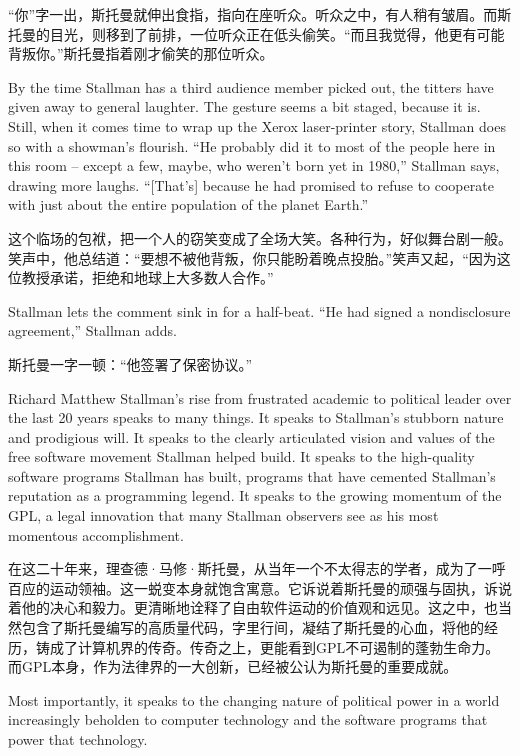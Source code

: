 \ifdefined\chs
``你''字一出，斯托曼就伸出食指，指向在座听众。听众之中，有人稍有皱眉。而斯托曼的目光，则移到了前排，一位听众正在低头偷笑。``而且我觉得，他更有可能背叛你。''斯托曼指着刚才偷笑的那位听众。
\fi

\ifdefined\eng
By the time Stallman has a third audience member picked out, the titters have given away to general laughter. The gesture seems a bit staged, because it is. Still, when it comes time to wrap up the Xerox laser-printer story, Stallman does so with a showman's flourish. ``He probably did it to most of the people here in this room -- except a few, maybe, who weren't born yet in 1980,'' Stallman says, drawing more laughs. ``[That's] because he had promised to refuse to cooperate with just about the entire population of the planet Earth.''
\fi

\ifdefined\chs
这个临场的包袱，把一个人的窃笑变成了全场大笑。各种行为，好似舞台剧一般。笑声中，他总结道：``要想不被他背叛，你只能盼着晚点投胎。''笑声又起，``因为这位教授承诺，拒绝和地球上大多数人合作。''
\fi

\ifdefined\eng
Stallman lets the comment sink in for a half-beat. ``He had signed a nondisclosure agreement,'' Stallman adds.
\fi

\ifdefined\chs
斯托曼一字一顿：``他签署了保密协议。''
\fi

\ifdefined\eng
Richard Matthew Stallman's rise from frustrated academic to political leader over the last 20 years speaks to many things. It speaks to Stallman's stubborn nature and prodigious will. It speaks to the clearly articulated vision and values of the free software movement Stallman helped build. It speaks to the high-quality software programs Stallman has built, programs that have cemented Stallman's reputation as a programming legend. It speaks to the growing momentum of the GPL, a legal innovation that many Stallman observers see as his most momentous accomplishment.
\fi

\ifdefined\chs
在这二十年来，理查德·马修·斯托曼，从当年一个不太得志的学者，成为了一呼百应的运动领袖。这一蜕变本身就饱含寓意。它诉说着斯托曼的顽强与固执，诉说着他的决心和毅力。更清晰地诠释了自由软件运动的价值观和远见。这之中，也当然包含了斯托曼编写的高质量代码，字里行间，凝结了斯托曼的心血，将他的经历，铸成了计算机界的传奇。传奇之上，更能看到GPL不可遏制的蓬勃生命力。而GPL本身，作为法律界的一大创新，已经被公认为斯托曼的重要成就。
\fi

\ifdefined\eng
Most importantly, it speaks to the changing nature of political power in a world increasingly beholden to computer technology and the software programs that power that technology.
\fi

